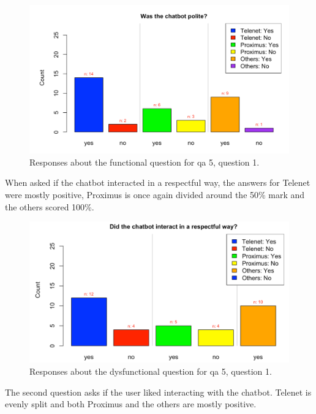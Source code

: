 \begin{figure}[!htb]
	\includegraphics[width=\linewidth, scale=0.5]{../LaTeX/Figures/Comparative/Q5.png}
	\caption{Responses about the functional question for \acrshort{qa} 5, question 1.}\label{fig:Q5}
\end{figure}
\break
When asked if the chatbot interacted in a respectful way, the answers for Telenet were mostly positive, Proximus is once again divided around the 50\% mark and the others scored 100\%.\\
\begin{figure}[!htb]
	\includegraphics[width=\linewidth, scale=0.5]{../LaTeX/Figures/Comparative/DQ5.png}
	\caption{Responses about the dysfunctional question for \acrshort{qa} 5, question 1.}\label{fig:DQ5}
\end{figure}
\break
The second question asks if the user liked interacting with the chatbot. Telenet is evenly split and both Proximus and the others are mostly positive.\\
